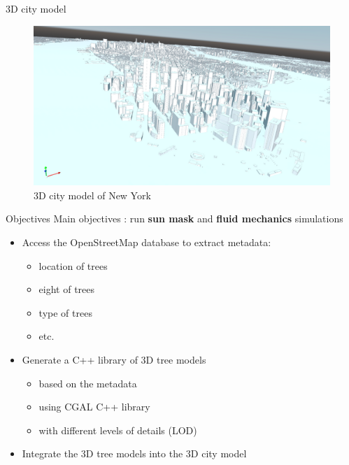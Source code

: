 \documentclass[10pt]{beamer}
\begin{document}
\begin{frame}{3D city model}
  \begin{figure}[h] %
    \centering
    \includegraphics[width=1\textwidth]{images/NY_mesh.png}
    \caption{3D city model of New York } %
    \label{} %
  \end{figure} 
\end{frame}

\begin{frame}{Objectives}
  Main objectives : run \textbf{sun mask} and \textbf{fluid mechanics} simulations \\
  \vspace{0.5cm}

  \begin{itemize}
    \item<2-> Access the OpenStreetMap database to extract metadata:
    \begin{itemize}
      \item<3-> location of trees
      \item<4-> eight of trees
      \item <5-> type of trees
      \item <6-> etc.
    \end{itemize}
    \item<7-> Generate a C++ library of 3D tree models
    \begin{itemize}
      \item <8-> based on the metadata
      \item <9-> using CGAL C++ library
      \item <10-> with different levels of details (LOD)
    \end{itemize}
    \item<11-> Integrate the 3D tree models into the 3D city model
  \end{itemize}
\end{frame}
\end{document}

